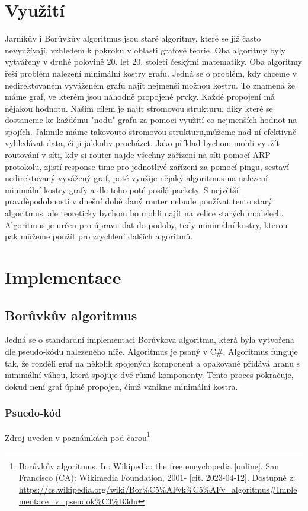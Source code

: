 \documentclass[11pt]{article}
\begin{document}
\section{Využití}
Jarníkův i Borůvkův algoritmus jsou staré algoritmy, které se již často nevyužívají, vzhledem k pokroku v oblasti grafové teorie. Oba algoritmy byly vytvářeny v druhé polovině 20. let 20. století českými matematiky. Oba algoritmy řeší problém nalezení minimální kostry grafu. Jedná se o problém, kdy chceme v nedirektovaném vyváženém grafu najít nejmenší možnou kostru. To znamená že máme graf, ve kterém jsou náhodně propojené prvky. Každé propojení má nějakou hodnotu. Naším cílem je najít stromovou strukturu, díky které se dostaneme ke každému "nodu" grafu za pomoci využití co nejmenších hodnot na spojích. Jakmile máme takovouto stromovou strukturu,můžeme nad ní efektivně vyhledávat data, či ji jakkoliv procházet. Jako příklad bychom mohli využít routování v síti, kdy si router najde všechny zařízení na síti pomocí ARP protokolu, zjistí response time pro jednotlivé zařízení za pomocí pingu, sestaví nedirektovaný vyvážený graf, poté využije nějaký algoritmus na nalezení minimální kostry grafy a dle toho poté posílá packety. S největší pravděpodobností v dnešní době daný router nebude používat tento starý algoritmus, ale teoreticky bychom ho mohli najít na velice starých modelech. Algoritmus je určen pro úpravu dat do podoby, tedy minimální kostry, kterou pak můžeme použít pro zrychlení dalších algoritmů.

\pagebreak

\section{Implementace}

\subsection{Borůvkův algoritmus}
Jedná se o standardní implementaci Borůvkova algoritmu, která byla vytvořena dle pseudo-kódu nalezeného níže. Algoritmus je psaný v C\#.
Algoritmus funguje tak, že rozdělí graf na několik spojených komponent a opakovaně přidává hranu s minimální váhou, která spojuje dvě různé komponenty. Tento proces pokračuje, dokud není graf úplně propojen, čímž vznikne minimální kostra.

\subsubsection{Psuedo-kód}
Zdroj uveden v poznámkách pod čarou\footnote{Borůvkův algoritmus. In: Wikipedia: the free encyclopedia [online]. San Francisco (CA): Wikimedia Foundation, 2001- [cit. 2023-04-12]. Dostupné z: \url{https://cs.wikipedia.org/wiki/Bor\%C5\%AFvk\%C5\%AFv_algoritmus\#Implementace_v_pseudok\%C3\%B3du}}
\end{document}
